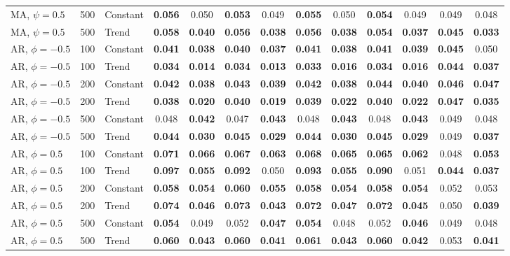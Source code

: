 \begin{tabular}{lrlcccccccccc}
MA, $\psi = 0.5$ & 500 & Constant & \textbf{0.056} & 0.050 & \textbf{0.053} & 0.049 & \textbf{0.055} & 0.050 & \textbf{0.054} & 0.049 & 0.049 & 0.048 \\
MA, $\psi = 0.5$ & 500 & Trend & \textbf{0.058} & \textbf{0.040} & \textbf{0.056} & \textbf{0.038} & \textbf{0.056} & \textbf{0.038} & \textbf{0.054} & \textbf{0.037} & \textbf{0.045} & \textbf{0.033} \\
\addlinespace
AR, $\phi = -0.5$ & 100 & Constant & \textbf{0.041} & \textbf{0.038} & \textbf{0.040} & \textbf{0.037} & \textbf{0.041} & \textbf{0.038} & \textbf{0.041} & \textbf{0.039} & \textbf{0.045} & 0.050 \\
AR, $\phi = -0.5$ & 100 & Trend & \textbf{0.034} & \textbf{0.014} & \textbf{0.034} & \textbf{0.013} & \textbf{0.033} & \textbf{0.016} & \textbf{0.034} & \textbf{0.016} & \textbf{0.044} & \textbf{0.037} \\
AR, $\phi = -0.5$ & 200 & Constant & \textbf{0.042} & \textbf{0.038} & \textbf{0.043} & \textbf{0.039} & \textbf{0.042} & \textbf{0.038} & \textbf{0.044} & \textbf{0.040} & \textbf{0.046} & \textbf{0.047} \\
AR, $\phi = -0.5$ & 200 & Trend & \textbf{0.038} & \textbf{0.020} & \textbf{0.040} & \textbf{0.019} & \textbf{0.039} & \textbf{0.022} & \textbf{0.040} & \textbf{0.022} & \textbf{0.047} & \textbf{0.035} \\
AR, $\phi = -0.5$ & 500 & Constant & 0.048 & \textbf{0.042} & 0.047 & \textbf{0.043} & 0.048 & \textbf{0.043} & 0.048 & \textbf{0.043} & 0.049 & 0.048 \\
AR, $\phi = -0.5$ & 500 & Trend & \textbf{0.044} & \textbf{0.030} & \textbf{0.045} & \textbf{0.029} & \textbf{0.044} & \textbf{0.030} & \textbf{0.045} & \textbf{0.029} & 0.049 & \textbf{0.037} \\
\addlinespace
AR, $\phi = 0.5$ & 100 & Constant & \textbf{0.071} & \textbf{0.066} & \textbf{0.067} & \textbf{0.063} & \textbf{0.068} & \textbf{0.065} & \textbf{0.065} & \textbf{0.062} & 0.048 & \textbf{0.053} \\
AR, $\phi = 0.5$ & 100 & Trend & \textbf{0.097} & \textbf{0.055} & \textbf{0.092} & 0.050 & \textbf{0.093} & \textbf{0.055} & \textbf{0.090} & 0.051 & \textbf{0.044} & \textbf{0.037} \\
AR, $\phi = 0.5$ & 200 & Constant & \textbf{0.058} & \textbf{0.054} & \textbf{0.060} & \textbf{0.055} & \textbf{0.058} & \textbf{0.054} & \textbf{0.058} & \textbf{0.054} & 0.052 & 0.053 \\
AR, $\phi = 0.5$ & 200 & Trend & \textbf{0.074} & \textbf{0.046} & \textbf{0.073} & \textbf{0.043} & \textbf{0.072} & \textbf{0.047} & \textbf{0.072} & \textbf{0.045} & 0.050 & \textbf{0.039} \\
AR, $\phi = 0.5$ & 500 & Constant & \textbf{0.054} & 0.049 & 0.052 & \textbf{0.047} & \textbf{0.054} & 0.048 & 0.052 & \textbf{0.046} & 0.049 & 0.048 \\
AR, $\phi = 0.5$ & 500 & Trend & \textbf{0.060} & \textbf{0.043} & \textbf{0.060} & \textbf{0.041} & \textbf{0.061} & \textbf{0.043} & \textbf{0.060} & \textbf{0.042} & 0.053 & \textbf{0.041} \\
\bottomrule
\end{tabular}
